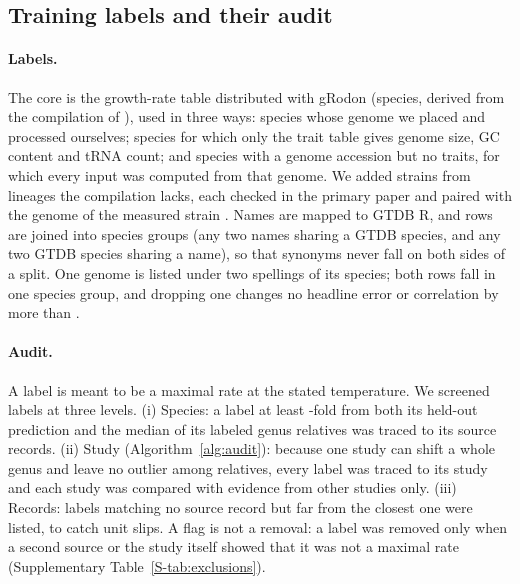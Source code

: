 \subsection{Training labels and their audit}
\paragraph{Labels.} The core is the growth-rate table distributed with gRodon (\NGrowthTable species, derived from the
compilation of \citet{madin2020}), used in three ways: species whose genome we placed and processed ourselves; species for
which only the trait table gives genome size, GC content and tRNA count; and species with a genome accession but no traits,
for which every input was computed from that genome. We added \NLiteratureWord strains from lineages the compilation lacks,
each checked in the primary paper and paired with the genome of the measured strain
\citep{konneke2005,stieglmeier2014,palatinszky2015,nowka2015,mohammadi2017,lehtovirtamorley2014}. Names are mapped to
GTDB R\GTDBRelease \citep{parks2022}, and rows are joined into species groups (any two names sharing a GTDB species, and
any two GTDB species sharing a name), so that synonyms never fall on both sides of a split. One genome is listed under two spellings of its species; both rows fall in one species group, and dropping one changes
no headline error or correlation by more than \DupMaxChange.

\paragraph{Audit.} A label is meant to be a maximal rate at the stated temperature. We screened labels at three levels.
(i) Species: a label at least \ScreenFoldWord-fold from both its held-out prediction and the median of its labeled genus
relatives was traced to its source records. (ii) Study (Algorithm~\ref{alg:audit}): because one study can shift a whole
genus and leave no outlier among relatives, every label was traced to its study and each study was compared with evidence
from other studies only. (iii) Records: labels matching no source record but far from the closest one were listed, to
catch unit slips. A flag is not a removal: a label was removed only when a second source or the study itself showed that
it was not a maximal rate (Supplementary Table~\ref{S-tab:exclusions}).


